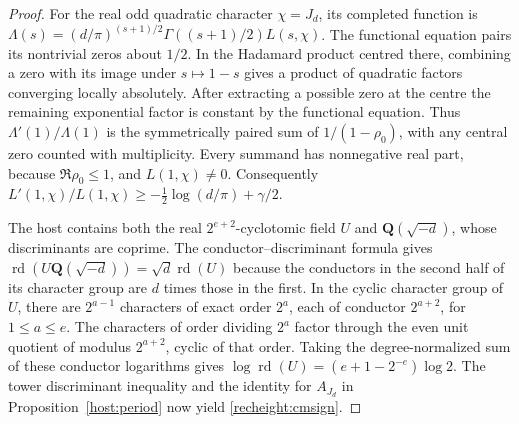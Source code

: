 \begin{proof}
For the real odd quadratic character \(\chi=J_d\), its completed
function is
\(\Lambda(s)=(d/\pi)^{(s+1)/2}\Gamma((s+1)/2)L(s,\chi)\).
The functional equation pairs its nontrivial zeros about \(1/2\).
In the Hadamard product centred there, combining a zero with its
image under \(s\mapsto1-s\) gives a product of quadratic factors
converging locally absolutely. After extracting a possible zero
at the centre the remaining exponential factor is constant by the
functional equation. Thus \(\Lambda'(1)/\Lambda(1)\) is the
symmetrically paired sum of \(1/(1-\rho_0)\), with any central zero
counted with multiplicity. Every summand has nonnegative real part,
because \(\Re\rho_0\le1\), and \(L(1,\chi)\ne0\).
Consequently \(L'(1,\chi)/L(1,\chi)\ge
-\frac12\log(d/\pi)+\gamma/2\).

The host contains both the real \(2^{e+2}\)-cyclotomic field \(U\)
and \(\mathbf Q(\sqrt{-d})\), whose discriminants are coprime.
The conductor--discriminant formula gives
\(\operatorname{rd}(U\mathbf Q(\sqrt{-d}))=\sqrt d\operatorname{rd}(U)\)
because the conductors in the second half of its character group are \(d\)
times those in the first. In the cyclic character group of \(U\),
there are \(2^{a-1}\) characters of exact order \(2^a\), each of
conductor \(2^{a+2}\), for \(1\le a\le e\). The characters of order
dividing \(2^a\) factor through the even unit quotient of modulus
\(2^{a+2}\), cyclic of that order. Taking the degree-normalized sum
of these conductor logarithms gives
\(\log\operatorname{rd}(U)=(e+1-2^{-e})\log 2\).
The tower discriminant inequality and the identity for \(A_{J_d}\)
in Proposition~\ref{host:period} now yield \eqref{recheight:cmsign}.


\end{proof}
